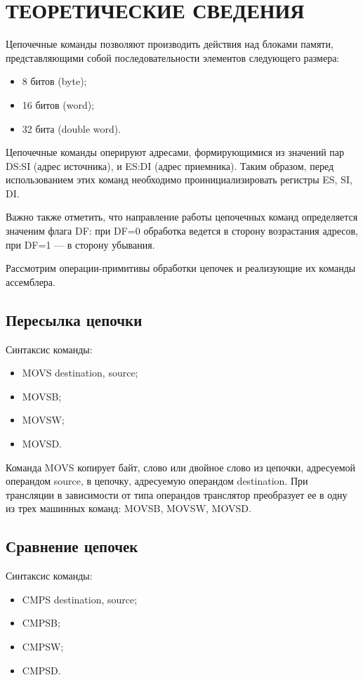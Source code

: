 \section{ТЕОРЕТИЧЕСКИЕ СВЕДЕНИЯ}

Цепочечные команды позволяют производить действия над блоками памяти,
представляющими собой последовательности элементов следующего размера:

\begin{itemize}
\item 8 битов (byte);
\item 16 битов (word);
\item 32 бита (double word).
\end{itemize}

Цепочечные команды оперируют адресами,
формирующимися из значений пар DS:SI (адрес источника), и
ES:DI (адрес приемника). 
Таким образом, перед использованием этих команд необходимо проинициализировать
регистры ES, SI, DI.

Важно также отметить, что направление работы цепочечных команд определяется 
значеним флага DF: при DF=0 обработка ведется в сторону возрастания адресов,
при DF=1 --- в сторону убывания.

Рассмотрим операции-примитивы обработки цепочек и реализующие их команды
ассемблера.

\subsection{Пересылка цепочки}

Синтаксис команды:
\begin{itemize}
\item MOVS destination, source;
\item MOVSB;
\item MOVSW;
\item MOVSD.
\end{itemize}

Команда MOVS копирует байт, слово или двойное слово из цепочки, адресуемой операндом
source, в цепочку, адресуемую операндом destination. При трансляции в зависимости от
типа операндов транслятор преобразует ее в одну из трех машинных команд:
MOVSB, MOVSW, MOVSD.

\subsection{Сравнение цепочек}

Синтаксис команды:
\begin{itemize}
\item CMPS destination, source;
\item CMPSB;
\item CMPSW;
\item CMPSD.
\end{itemize}

